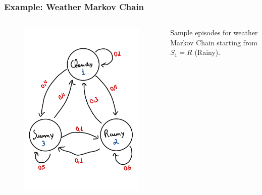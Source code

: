 \begin{frame}
    \frametitle{Example: Weather Markov Chain}

    \begin{columns}
        \begin{column}{0.5\textwidth}
            \begin{figure}
                \centering
                \includegraphics[width=1\textwidth]{sections/markov/figures/weather_markov_chain_02.pdf}
            \end{figure}
        \end{column}

        \begin{column}{0.5\textwidth}

            Sample episodes for weather Markov Chain starting from $S_1 = R$ (Rainy).


\end{column}
\end{columns}
\end{frame}
